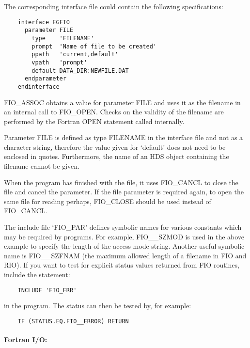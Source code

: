 The corresponding interface file could contain the following specifications:

\begin{small}
\begin{verbatim}
    interface EGFIO
      parameter FILE
        type    'FILENAME'
        prompt  'Name of file to be created'
        ppath   'current,default'
        vpath   'prompt'
        default DATA_DIR:NEWFILE.DAT
      endparameter
    endinterface
\end{verbatim}
\end{small}

FIO\_ASSOC obtains a value for parameter FILE and uses it as the filename in an
internal call to FIO\_OPEN.
Checks on the validity of the filename are performed by the Fortran OPEN
statement called internally.

Parameter FILE is defined as type FILENAME in the interface file and not as a
character string, therefore the value given for `default' does not need to be
enclosed in quotes.
Furthermore, the name of an HDS object containing the filename cannot be
given.

When the program has finished with the file, it uses FIO\_CANCL to close the
file and cancel the parameter.
If the file parameter is required again, to open the same file for reading
perhaps, FIO\_CLOSE should be used instead of FIO\_CANCL.

The include file `FIO\_PAR' defines symbolic names for various constants which
may be required by programs.
For example, FIO\_\_SZMOD is used in the above example to specify the length of
the access mode string.
Another useful symbolic name is FIO\_\_SZFNAM (the maximum allowed length of
a filename in FIO and RIO).
If you want to test for explicit status values returned from FIO routines,
include the statement:

\begin{small}
\begin{verbatim}
    INCLUDE 'FIO_ERR'
\end{verbatim}
\end{small}

in the program.
The status can then be tested by, for example:

\begin{small}
\begin{verbatim}
    IF (STATUS.EQ.FIO__ERROR) RETURN
\end{verbatim}
\end{small}

\paragraph{Fortran I/O:}\hfill
{}


